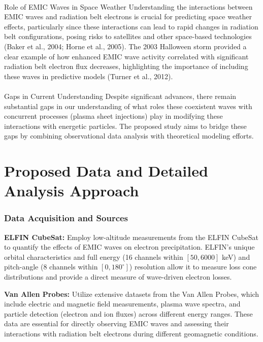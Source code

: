 \documentclass[
  letterpaper,
  DIV=11,
  numbers=noendperiod]{scrartcl}
\makeatletter
\let\oldparagraph\paragraph
\renewcommand{\paragraph}{
    \@ifstar
      \xxxParagraphStar
      \xxxParagraphNoStar
  }
\newcommand{\xxxParagraphStar}[1]{\oldparagraph*{#1}\mbox{}}
\newcommand{\xxxParagraphNoStar}[1]{\oldparagraph{#1}\mbox{}}
\makeatother
\begin{document}
\paragraph{Role of EMIC Waves in Space Weather}\label{role-of-emic-waves-in-space-weather}
Understanding the interactions between EMIC waves and radiation belt electrons is crucial for predicting space weather effects, particularly since these interactions can lead to rapid changes in radiation belt configurations, posing risks to satellites and other space-based technologies (Baker et al., 2004; Horne et al., 2005). The 2003 Halloween storm provided a clear example of how enhanced EMIC wave activity correlated with significant radiation belt electron flux decreases, highlighting the importance of including these waves in predictive models (Turner et al., 2012).

\paragraph{Gaps in Current Understanding}\label{gaps-in-current-understanding}
Despite significant advances, there remain substantial gaps in our understanding of what roles these coexistent waves with concurrent processes (plasma sheet injections) play in modifying these interactions with energetic particles. The proposed study aims to bridge these gaps by combining observational data analysis with theoretical modeling efforts.

\section{Proposed Data and Detailed Analysis Approach}\label{proposed-data-and-detailed-analysis-approach}

\subsubsection{Data Acquisition and Sources}\label{data-acquisition-and-sources}

\textbf{ELFIN CubeSat:} Employ low-altitude measurements from the ELFIN CubeSat to quantify the effects of EMIC waves on electron precipitation. ELFIN's unique orbital characteristics and full energy (16 channels within \([50,6000]\) keV) and pitch-angle (8 channels within \([0,180^\circ]\)) resolution allow it to measure loss cone distributions and provide a direct measure of wave-driven electron losses.

\textbf{Van Allen Probes:} Utilize extensive datasets from the Van Allen Probes, which include electric and magnetic field measurements, plasma wave spectra, and particle detection (electron and ion fluxes) across different energy ranges. These data are essential for directly observing EMIC waves and assessing their interactions with radiation belt electrons during different geomagnetic conditions.
\end{document}
